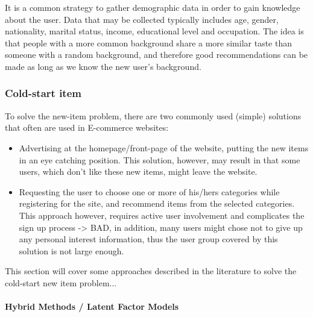 It is a common strategy to gather demographic data in order to gain knowledge
about the user. Data that may be collected typically includes age, gender,
nationality, marital status, income, educational level and occupation. The idea
is that people with a more common background share a more similar taste than
someone with a random background, and therefore good recommendations can be
made as long as we know the new user’s background.


\subsubsection{Cold-start item}

To solve the new-item problem, there are two commonly used (simple) solutions
that often are used in E-commerce websites:

\begin{itemize}
\item Advertising at the homepage/front-page of the website, putting the new
items in an eye catching position. This solution, however, may 		result in
that some users, which don't like these new items, might leave the website.
\item Requesting the user to choose one or more of his/hers categories while
registering for the site, and recommend items from the selected categories.
This approach however, requires active user involvement and complicates the
sign up process -> BAD, in addition, many users might chose not to give up any
personal interest information, thus the user group covered by this solution is
not large enough.
\end{itemize}

This section will cover some approaches described in the literature to solve
the cold-start new item problem...


\paragraph{Hybrid Methods / Latent Factor Models}


